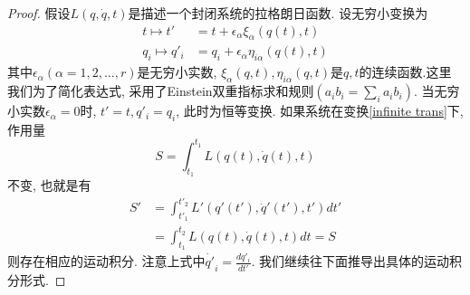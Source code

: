 \documentclass[a4paper,11pt]{book}
\newtheorem{proof}{证明}[section]
\begin{document}
\begin{proof}
  假设$L(q,\dot{q},t)$是描述一个封闭系统的拉格朗日函数. 设无穷小变换为
  \begin{equation}\label{infinite trans}
  \begin{split}
     t\mapsto t'&=t+\epsilon_\alpha\xi_\alpha(q(t),t) \\
       q_i\mapsto q'_i&=q_i+\epsilon_\alpha\eta_{i\alpha}(q(t),t)
  \end{split}
  \end{equation}
  其中$\epsilon_\alpha(\alpha=1,2,\dots,r)$是无穷小实数, $\xi_\alpha(q,t),\eta_{i\alpha}(q,t)$是$q,t$的连续函数.这里我们为了简化表达式, 采用了Einstein双重指标求和规则$(a_i b_i=\sum_{i}a_i b_i)$. 当无穷小实数$\epsilon_\alpha=0$时, $t'=t,q'_i=q_i$, 此时为恒等变换. 如果系统在变换\eqref{infinite trans}下, 作用量
  \begin{equation}\label{action inv inf}
    S=\int_{t_1}^{t_1}L(q(t),\dot{q}(t),t)
  \end{equation}
  不变, 也就是有
  \begin{equation*}
  \begin{split}
     S'&=\int_{t'_1}^{t'_2}L'(q'(t'),\dot{q}'(t'),t')dt' \\
       &=\int_{t_1}^{t_2}L(q(t),\dot{q}(t),t)dt=S
  \end{split}
  \end{equation*}
  则存在相应的运动积分. 注意上式中$\dot{q'}_i=\frac{d{q'_i}}{dt'}$. 我们继续往下面推导出具体的运动积分形式.


\end{proof}
\end{document}

